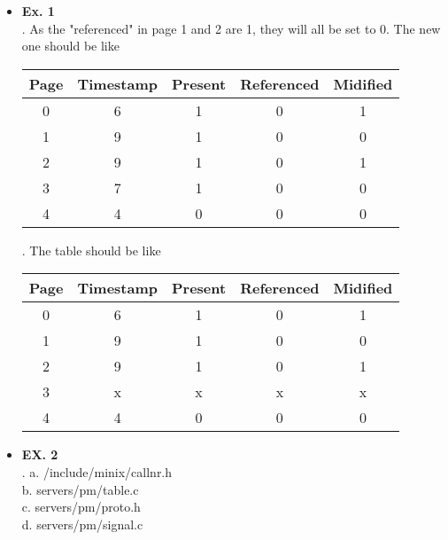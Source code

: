 \documentclass{article}
\begin{document}
\begin{itemize}
\item {\bf Ex. 1}\\
{. As the "referenced" in page 1 and 2 are 1, they will all be set to 0. The new one should be like } 

\begin{table}[h]
    \centering
    \begin{tabular}{ccccc}
    \hline
    Page & Timestamp & Present & Referenced & Midified \\ \hline
    0    & 6         & 1       & 0          & 1        \\
    1    & 9         & 1       & 0          & 0        \\
    2    & 9         & 1       & 0          & 1        \\
    3    & 7         & 1       & 0          & 0        \\
    4    & 4         & 0       & 0          & 0        \\ \hline
    \end{tabular}
\end{table}

{. The table should be like \\}

\begin{table}[h]
    \centering
    \begin{tabular}{ccccc}
    \hline
    Page & Timestamp & Present & Referenced & Midified \\ \hline
    0    & 6         & 1       & 0          & 1        \\
    1    & 9         & 1       & 0          & 0        \\
    2    & 9         & 1       & 0          & 1        \\
    3    & x         & x       & x          & x        \\
    4    & 4         & 0       & 0          & 0        \\ \hline
    \end{tabular}
\end{table}

\item {\bf EX. 2}\\
{. a. /include/minix/callnr.h \\ b. servers/pm/table.c \\c. servers/pm/proto.h\\ d. servers/pm/signal.c }


\end{itemize}
\end{document}
